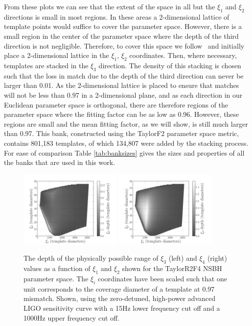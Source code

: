 From these plots we can see that the extent of the space in all but the $\xi_1$
and $\xi_2$ directions is small in most regions. In these areas a
2-dimensional lattice of template points would suffice to cover the parameter
space. However, there is a
small region in the center of the parameter space where the depth of the third
direction is not negligible. Therefore, to cover this space we
follow~\cite{Brown:2012qf} and initially place a 2-dimensional lattice in the
$\xi_1$, $\xi_2$ coordinates. Then, where necessary, templates are stacked in
the $\xi_3$ direction. The density of this stacking is chosen such that the loss
in match due to the depth of the third direction can never be larger than 0.01.
As the 2-dimensional lattice is placed to ensure that matches will not be less
than 0.97 in a 2-dimensional plane, and as each direction in our Euclidean 
parameter space is orthogonal, there are therefore regions of the parameter
space where the fitting factor can be as low as 0.96. However, these regions are
small and the mean fitting factor, as we will show, is still much larger than
0.97. This bank, constructed using the TaylorF2 parameter space metric, contains
801,183 templates, of which 134,807 were added by the stacking process. For
ease of comparison Table \ref{tab:banksizes} gives the sizes and properties of
all the banks that are used in this work.

\begin{figure}
    \centering
    \begin{minipage}[l]{2.0\columnwidth}
    \centering
\includegraphics[width=0.45\textwidth]
{papers/nsbh_effectualness/figure2A.png}
\includegraphics[width=0.45\textwidth]
{papers/nsbh_effectualness/figure2B.png}
\caption{\label{fig:bankF4depths}
The depth of the
physically possible range of $\xi_3$ (left) and $\xi_4$ (right) values as a
function of
$\xi_1$ and $\xi_2$ shown for the TaylorR2F4 \ac{NSBH} parameter
space. The $\xi_i$ coordinates have been scaled
such that one unit corresponds to the coverage diameter of a template
at 0.97 mismatch. Shown, using the zero-detuned, high-power advanced LIGO
sensitivity curve with a 15Hz
lower frequency cut off and a 1000Hz upper frequency cut off.}
\end{minipage}
\end{figure}

